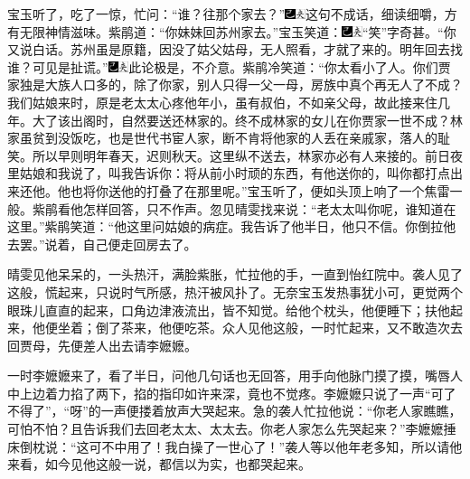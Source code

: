 宝玉听了，吃了一惊，忙问：``谁？往那个家去？''{\includegraphics[width=3mm]{../Images/00003}\includegraphics[width=3mm]{../Images/00012}\footnotesize \kaishu 这句不成话，细读细嚼，方有无限神情滋味。}紫鹃道：``你妹妹回苏州家去。''宝玉笑道：{\includegraphics[width=3mm]{../Images/00003}\includegraphics[width=3mm]{../Images/00012}\footnotesize \kaishu ``笑''字奇甚。}``你又说白话。苏州虽是原籍，因没了姑父姑母，无人照看，才就了来的。明年回去找谁？可见是扯谎。''{\includegraphics[width=3mm]{../Images/00003}\includegraphics[width=3mm]{../Images/00012}\footnotesize \kaishu 此论极是，不介意。}紫鹃冷笑道：``你太看小了人。你们贾家独是大族人口多的，除了你家，别人只得一父一母，房族中真个再无人了不成？我们姑娘来时，原是老太太心疼他年小，虽有叔伯，不如亲父母，故此接来住几年。大了该出阁时，自然要送还林家的。终不成林家的女儿在你贾家一世不成？林家虽贫到没饭吃，也是世代书宦人家，断不肯将他家的人丢在亲戚家，落人的耻笑。所以早则明年春天，迟则秋天。这里纵不送去，林家亦必有人来接的。前日夜里姑娘和我说了，叫我告诉你：将从前小时顽的东西，有他送你的，叫你都打点出来还他。他也将你送他的打叠了在那里呢。''宝玉听了，便如头顶上响了一个焦雷一般。紫鹃看他怎样回答，只不作声。忽见晴雯找来说：``老太太叫你呢，谁知道在这里。''紫鹃笑道：``他这里问姑娘的病症。我告诉了他半日，他只不信。你倒拉他去罢。''说着，自己便走回房去了。

晴雯见他呆呆的，一头热汗，满脸紫胀，忙拉他的手，一直到怡红院中。袭人见了这般，慌起来，只说时气所感，热汗被风扑了。无奈宝玉发热事犹小可，更觉两个眼珠儿直直的起来，口角边津液流出，皆不知觉。给他个枕头，他便睡下；扶他起来，他便坐着；倒了茶来，他便吃茶。众人见他这般，一时忙起来，又不敢造次去回贾母，先便差人出去请李嬷嬷。

一时李嬷嬷来了，看了半日，问他几句话也无回答，用手向他脉门摸了摸，嘴唇人中上边着力掐了两下，掐的指印如许来深，竟也不觉疼。李嬷嬷只说了一声``可了不得了''，``呀''的一声便搂着放声大哭起来。急的袭人忙拉他说：``你老人家瞧瞧，可怕不怕？且告诉我们去回老太太、太太去。你老人家怎么先哭起来？''李嬷嬷捶床倒枕说：``这可不中用了！我白操了一世心了！''袭人等以他年老多知，所以请他来看，如今见他这般一说，都信以为实，也都哭起来。

